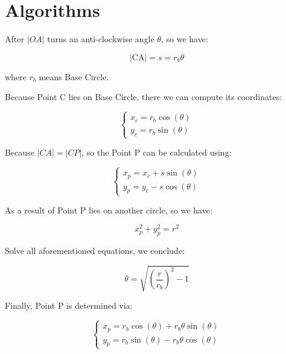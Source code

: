 \documentclass[10pt,a4paper]{article}
\begin{document}
	\section{Algorithms}
	After $ |OA| $ turns an anti-clockwise angle $ \theta $, so we have:
	
	\begin{equation}
	|\mathrm{CA}| = s = r_b \theta
	\end{equation}
	
	where $ r_b $ means Base Circle.
	
	Because Point C lies on Base Circle, there we can compute its coordinates:
	
	\begin{equation}
		\begin{cases}
		x_c = r_b \cos(\theta) \\
		y_c = r_b \sin(\theta)
		\end{cases}
	\end{equation}
	
	Because $ |CA| = |CP| $, so the Point P can be calculated using:
	
	\begin{equation}
		\begin{cases}
			x_p = x_c + s \sin(\theta) \\
			y_p = y_c - s \cos(\theta)
		\end{cases}
	\end{equation}
	
	As a result of Point P lies on another circle, so we have:
	
	\begin{equation}
		x_p^2+y_p^2 = r^2
	\end{equation}
	
	Solve all aforementioned equations, we conclude:
	
	\begin{equation}
		\theta = \sqrt{(\dfrac{r}{r_b})^2-1}
	\end{equation}
	
	Finally, Point P is determined via:
	
	\begin{equation}
		\begin{cases}
			x_p = r_b \cos(\theta)+r_b\theta \sin(\theta)\\
			y_p = r_b \sin(\theta)-r_b\theta \cos(\theta)
		\end{cases}
	\end{equation}
\end{document}
